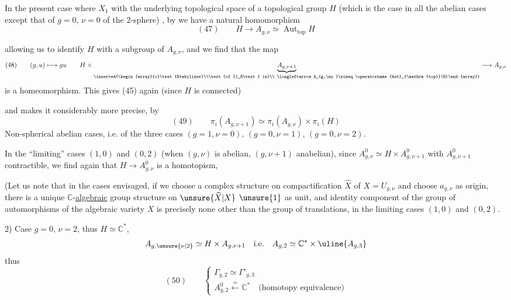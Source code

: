 In the present case where  $X_1$   with the underlying topological space of a topological group $H$ (which is the case in all the abelian cases except that of $g=0$, $\nu=0$ of the $2$-sphere) , by  we have a natural homomorphism
\[
(47)\qquad H\longrightarrow A_{g,\nu}\simeq\operatorname{Aut}_{\mathrm{top}}H
\]

allowing us to identify $H$ with a  subgroup of $A_{g,\nu}$, and we find that the map
\[
(48)\qquad (g,u)\longmapsto gu\qquad
H\times\underbrace{A_{g,\nu+1}}_{\inserted{\begin{array}{c}\text{Stabilizer}\\\text{of }1_H\text{ in}\\ \longleftarrow A_{g,\nu}\simeq\operatorname{Aut}_{\mathrm{top}}(H)\end{array}}}
\longrightarrow A_{g,\nu}
\]
is a homeomorphism.  This  gives (45) again (since $H$ is connected)

and makes it considerably more precise, by
\[
(49)\qquad\pi_i(A_{g,\nu+1})\simeq\pi_i(A_{g,\nu})\times\pi_i(H)
\]
Non-spherical abelian cases, i.e.  of the three cases $(g=1,\nu=0)$, $(g=0,\nu=1)$, $(g=0,\nu=2)$.

In the ``limiting'' cases $(1,0)$ and $(0,2)$ (when $(g,\nu)$ is abelian, $(g,\nu+1)$ anabelian), since $A^0_{g,\nu}\simeq H\times A^0_{g,\nu+1}$ with $A^0_{g,\nu+1}$ contractible, we find again that $H\longrightarrow A^0_{g,\nu}$ is a homotopism, 

(Let us note that in the cases envisaged, if we choose a complex structure on   compactification $\widehat X$ of $X=U_{g,\nu}$ and choose $a_{g,\nu}$ as origin, there is a unique $\mathbb{C}$-\uline{algebraic} group structure on $\unsure{\widehat X|X}$  $\unsure{1}$ as unit, and    identity component of the group of automorphisms of the algebraic variety $X$ is precisely none other than the group of translations, in the limiting cases $(1,0)$ and $(0,2)$.

2) Case $g=0$, $\nu=2$, thus $H\simeq\mathbb{C}^*$,
\[
A_{g,\unsure{\nu|2}}\simeq H\times A_{g,\nu+1}\quad\text{i.e.}\quad A_{g,2}\simeq\mathbb{C}^*\times\uline{A_{g,3}}
\]
thus
\[
(50)\qquad\left\{\begin{array}{l}
\Gamma_{g,2}\simeq\Gamma'_{g,3}\\
A^0_{g,2}\xleftarrow{\simeq}\mathbb{C}^*\quad\text{(homotopy equivalence)}
\end{array}\right.
\]

